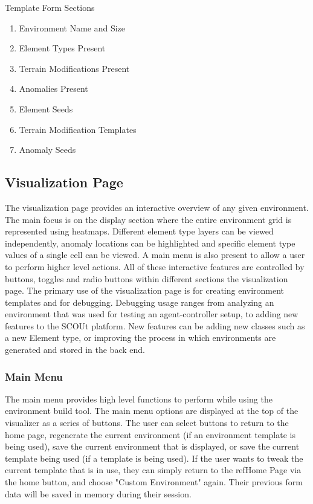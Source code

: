 Template Form Sections
\begin{enumerate}
  \item Environment Name and Size
  \item Element Types Present
  \item Terrain Modifications Present
  \item Anomalies Present
  \item Element Seeds
  \item Terrain Modification Templates
  \item Anomaly Seeds
\end{enumerate}


\subsection{Visualization Page}
The visualization page provides an interactive overview of any given environment.
The main focus is on the display section where the entire environment grid is represented using heatmaps.
Different element type layers can be viewed independently, anomaly locations can be highlighted and specific element type values of a single cell can be viewed.
A main menu is also present to allow a user to perform higher level actions.
All of these interactive features are controlled by buttons, toggles and radio buttons within different sections the visualization page.
The primary use of the visualization page is for creating environment templates and for debugging.
Debugging usage ranges from analyzing an environment that was used for testing an agent-controller setup, to adding new features to the SCOUt platform.
New features can be adding new classes such as a new Element type, or improving the process in which environments are generated and stored in the back end.


\subsubsection{Main Menu}
The main menu provides high level functions to perform while using the environment build tool.
The main menu options are displayed at the top of the visualizer as a series of buttons.
The user can select buttons to return to the home page, regenerate the current environment (if an environment template is being used), save the current environment that is displayed, or save the current template being used (if a template is being used).
If the user wants to tweak the current template that is in use, they can simply return to the ref{Home Page} via the home button, and choose "Custom Environment" again.
Their previous form data will be saved in memory during their session.


